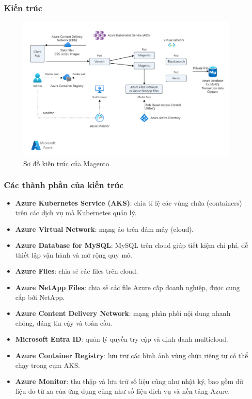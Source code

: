 \subsubsection{Kiến trúc}
\begin{figure}[H]
    \centering
    \includegraphics[scale=0.7]{images/hieu/chap-2/magento-architecture.png}
    \caption{Sơ đồ kiến trúc của Magento}
\end{figure}    
\subsubsection{Các thành phần của kiến trúc}
    \begin{itemize}
        \item \textbf{Azure Kubernetes Service (AKS)}: chia tỉ lệ các vùng chứa (containers) trên các dịch vụ mà Kubernetes quản lý.
        \item \textbf{Azure Virtual Network}: mạng ảo trên đám mây (cloud).
        \item \textbf{Azure Database for MySQL}: MySQL trên cloud giúp tiết kiệm chi phí, dễ thiết lập vận hành và mở rộng quy mô.
        \item \textbf{Azure Files}: chia sẻ các files trên cloud.
        \item \textbf{Azure NetApp Files}: chia sẻ các file Azure cấp doanh nghiệp, được cung cấp bởi NetApp.
        \item \textbf{Azure Content Delivery Network}: mạng phân phối nội dung nhanh chóng, đáng tin cậy và toàn cầu.
        \item \textbf{Microsoft Entra ID}: quản lý quyền try cập và định danh multicloud.
        \item \textbf{Azure Container Registry}: lưu trữ các hình ảnh vùng chứa riêng tư có thể chạy trong cụm AKS.
        \item \textbf{Azure Monitor}: thu thập và lưu trữ số liệu cũng như nhật ký, bao gồm dữ liệu đo từ xa của ứng dụng cũng như số liệu dịch vụ và nền tảng Azure.
    \end{itemize} 
